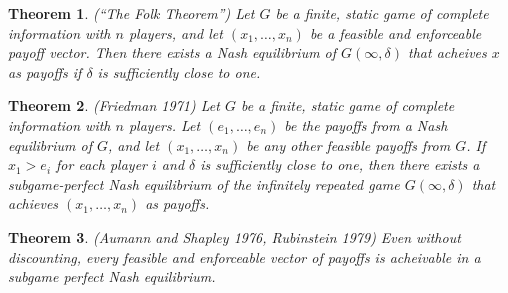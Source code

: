 \documentclass[letter, 10pt]{article}
\theoremstyle{basic}
\newtheorem{theorem}{Theorem}[section]
\begin{document}
\begin{spacing}{1.0}
\begin{theorem}
  (``The Folk Theorem'') Let $G$ be a finite, static game of complete
  information with $n$ players, and let $(x_1, \ldots, x_n)$ be a feasible
  and enforceable payoff vector. Then there exists a Nash equilibrium of
  $G(\infty, \delta)$ that acheives $x$ as payoffs if $\delta$ is
  sufficiently close to one.
\end{theorem}

\begin{theorem}
  (Friedman 1971) Let $G$ be a finite, static game of
  complete information with $n$ players. Let $(e_1,
  \ldots, e_n)$ be the payoffs from a Nash equilibrium of
  $G$, and let $(x_1, \ldots, x_n)$ be any other feasible
  payoffs from $G$. If $x_1 > e_i$ for each player $i$
  and $\delta$ is sufficiently close to one, then there
  exists a subgame-perfect Nash equilibrium of the
  infinitely repeated game $G(\infty, \delta)$ that
  achieves $(x_1, \ldots, x_n)$ as payoffs.
\end{theorem}

\begin{theorem}
  (Aumann and Shapley 1976, Rubinstein 1979) Even without discounting,
  every feasible and enforceable vector of payoffs is acheivable in a
  subgame perfect Nash equilibrium.
\end{theorem}



\end{spacing}
\end{document}
